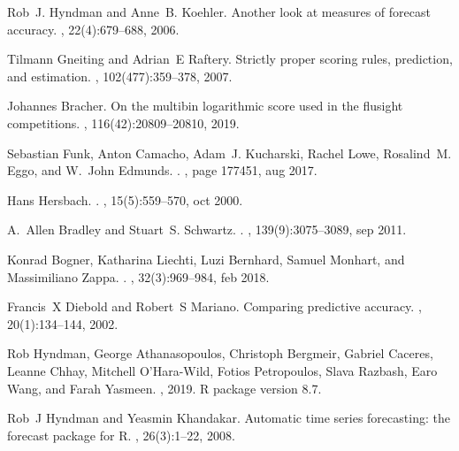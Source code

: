 \documentclass[a4paper]{article}
\begin{document}
\begin{thebibliography}{100}
Rob~J. Hyndman and Anne~B. Koehler.
\newblock Another look at measures of forecast accuracy.
, 22(4):679--688, 2006.

Tilmann Gneiting and Adrian~E Raftery.
\newblock Strictly proper scoring rules, prediction, and estimation.
,
  102(477):359--378, 2007.

Johannes Bracher.
\newblock On the multibin logarithmic score used in the flusight competitions.
,
  116(42):20809--20810, 2019.

Sebastian Funk, Anton Camacho, Adam~J. Kucharski, Rachel Lowe, Rosalind~M.
  Eggo, and W.~John Edmunds.
.
, page 177451, aug 2017.

Hans Hersbach.
.
, 15(5):559--570, oct 2000.

A.~Allen Bradley and Stuart~S. Schwartz.
.
, 139(9):3075--3089, sep 2011.

Konrad Bogner, Katharina Liechti, Luzi Bernhard, Samuel Monhart, and
  Massimiliano Zappa.
.
, 32(3):969--984, feb 2018.

Francis~X Diebold and Robert~S Mariano.
\newblock Comparing predictive accuracy.
, 20(1):134--144,
  2002.

Rob Hyndman, George Athanasopoulos, Christoph Bergmeir, Gabriel Caceres, Leanne
  Chhay, Mitchell O'Hara-Wild, Fotios Petropoulos, Slava Razbash, Earo Wang,
  and Farah Yasmeen.
, 2019.
\newblock R package version 8.7.

Rob~J Hyndman and Yeasmin Khandakar.
\newblock Automatic time series forecasting: the forecast package for {R}.
, 26(3):1--22, 2008.


\end{thebibliography}
\end{document}
